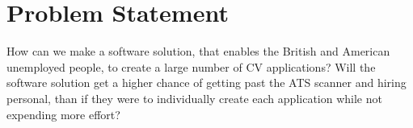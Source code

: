 \section{Problem Statement}\label{sec:problem}
How can we make a software solution, that enables the British and American unemployed people, 
to create a large number of CV applications?
Will the software solution get a higher chance of getting past the ATS scanner and hiring personal, than
if they were to individually create each application while not expending more effort? 